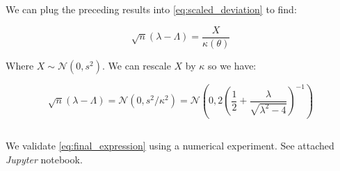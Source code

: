 \documentclass{article}
\begin{document}
We can plug the preceding results into \ref{eq:scaled_deviation} to find: 

\begin{equation}
	\sqrt{n}\left( \lambda - \Lambda \right) = \frac{X}{\kappa \left( \theta \right)}
\end{equation}

Where $X \sim \mathcal{N}\left( 0, s^2 \right)$. We can rescale $X$ by $\kappa$ so we have: 

\begin{equation}\label{eq:final_expression}
	\sqrt{n}\left( \lambda - \Lambda \right) 
= \mathcal{N}\left(0, s^2/\kappa^2\right)
= \mathcal{N}\left(0, 2 \left( \frac{1}{2} + \frac{\lambda}{\sqrt{\lambda^2 - 4}}\right)^{-1}  \right)
\end{equation}


\subsection{}

We validate \ref{eq:final_expression} using a numerical experiment. See attached \textit{Jupyter} notebook.
\end{document}
